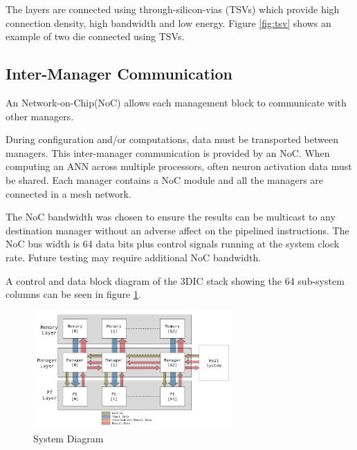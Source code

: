 \documentclass[journal]{IEEEtran}
\begin{document}
The layers are connected using through-silicon-vias (TSVs) which provide high connection density, high bandwidth and low energy.
Figure \ref{fig:tsv} shows an example of two die connected using TSVs.

\subsection{Inter-Manager Communication}
\label{ssec:Inter-Manager Communication}

An Network-on-Chip(NoC) allows each management block to communicate with other managers.

During configuration and/or computations, data must be transported between managers. This inter-manager communication is provided by an NoC.
When computing an ANN across multiple processors, often neuron activation data must be shared. 
Each manager contains a NoC module and all the managers are connected in a mesh network.

The NoC bandwidth was chosen to ensure the results can be multicast to any destination manager without an adverse affect on the pipelined instructions.
The NoC bus width is 64 data bits plus control signals running at the system clock rate. Future testing may require additional NoC bandwidth.

A control and data block diagram of the 3DIC stack showing the 64 sub-system columns can be seen in figure \ref{fig:FlowDiagram}.

\begin{figure}[!t]
\centering
\captionsetup{justification=centering}
\centerline{
\mbox{\includegraphics[width=3.0in]{FlowDiagram.jpg}}
}
\caption{System Diagram}
\label{fig:FlowDiagram}
\end{figure}
\end{document}
